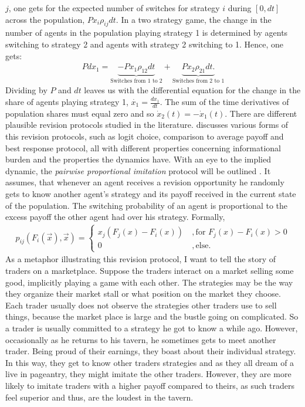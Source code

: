 $j$, one gets for the expected number of switches for strategy $i$ during 
$[0,dt]$ across the population,  $P x_i \rho_{ij} dt$. 
In a two strategy game, the change in the number of agents in the population 
playing strategy 1 is determined by agents switching to strategy 2 
and agents with strategy 2 switching to 1. Hence, one gets:
\begin{align} 
        Pdx_1 =  \underbrace{-Px_1 \rho_{12}dt}_{\text{Switches from 1 to 2}} 
        + \underbrace{Px_2 \rho_{21}dt.}_{\text{Switches from 2 to 1}}
\end{align}
Dividing by $P$ and $dt$ leaves us with the differential equation for
the change in the share of agents playing strategy 1, 
$\dot{x_1} =\frac{dx_1}{dt}$. 
The sum of the time derivatives of population shares must equal zero and so
$\dot{x}_2(t) =- \dot{x}_1(t)$.
There are different plausible revision protocols studied in the literature. 
\textcite[128,129,178]{sandholm_population_2010} discusses various forms of 
this revision protocols, such as logit choice, comparison to average payoff 
and best response 
protocol, all with different properties concerning informational 
burden and the
properties the dynamics have. With an eye to the implied dynamic, the 
\textit{pairwise proportional imitation} protocol will be outlined . 
It assumes, that whenever an
agent receives a revision opportunity he randomly gets to know 
another agent's strategy and its payoff received in the current 
state of the population. 
The switching probability of an agent is proportional to the 
excess payoff the other agent had over his strategy. 
Formally, 
\begin{align}
        \label{eq:pairwiseproportionalimitation}
        p_{ij}(F_i(\vec{x}),\vec{x}) =
                \begin{cases}
                        x_j(F_j(x) -F_i(x)) &\ , \text{for } F_j(x) - F_i(x) > 0 \\
                        0 &\ , \text{else}.
                \end{cases}
\end{align}
As a metaphor illustrating this revision protocol, I want to tell the 
story of traders on a marketplace.
Suppose the traders interact on a market selling some 
good, implicitly playing a game with each other. The strategies may be the
way they organize their market stall or what position on the market they 
choose. Each trader usually does not
observe the strategies other traders use to sell things, because the market
place is large and the bustle going on complicated. 
So a trader is usually committed to a strategy he got to know a while ago.
However, occasionally as he returns to his tavern, he sometimes gets to meet 
another trader. Being proud of their earnings, they boast about their 
individual strategy. In this way, they get to know
other traders strategies and as they all dream of a live in pageantry,
they might imitate the other traders. 
However, they are more likely to imitate traders with a higher payoff 
compared to theirs, as such traders feel superior and thus, are the 
loudest in the tavern. 

